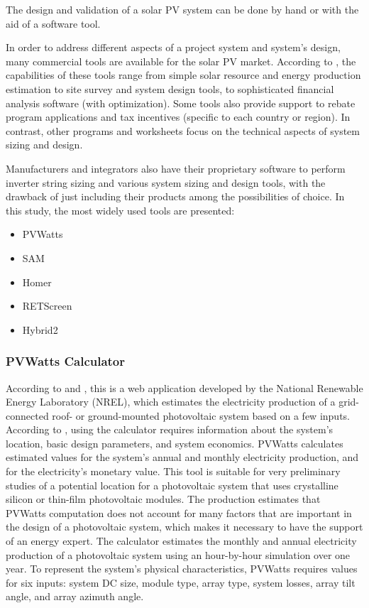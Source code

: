 The design and validation of a solar PV system can be done by hand or with the aid of a software tool. 

In order to address different aspects of a project system and system's design, many commercial tools are available for the solar PV market. According to \cite{Brooks}, the capabilities of these tools range from simple solar resource and energy production estimation to site survey and system design tools, to sophisticated financial analysis software (with optimization). Some tools also provide support to rebate program applications and tax incentives (specific to each country or region). In contrast, other programs and worksheets focus on the technical aspects of system sizing and design.
 
Manufacturers and integrators also have their proprietary software to perform inverter string sizing and various system sizing and design tools, with the drawback of just including their products among the possibilities of choice. In this study, the most widely used tools are presented: 

\begin{itemize}
\item PVWatts 
\item SAM
\item Homer
\item RETScreen
\item Hybrid2
\end{itemize}

\subsubsection{PVWatts Calculator}

According to \cite{Freeman} and \cite{NRELDobos}, this is a web application developed by the National Renewable Energy Laboratory (NREL), which estimates the electricity production of a grid-connected roof- or ground-mounted photovoltaic system based on a few inputs. According to \cite{NRELDobos}, using the calculator requires information about the system's location, basic design parameters, and system economics. PVWatts calculates estimated values for the system's annual and monthly electricity production, and for the electricity's monetary value. This tool is suitable for very preliminary studies of a potential location for a photovoltaic system that uses crystalline silicon or thin-film photovoltaic modules. The production estimates that PVWatts computation does not account for many factors that are important in the design of a photovoltaic system, which makes it necessary to have the support of an energy expert. The calculator estimates the monthly and annual electricity production of a photovoltaic system using an hour-by-hour simulation over one year. To represent the system's physical characteristics, PVWatts requires values for six inputs: system DC size, module type, array type, system losses, array tilt angle, and array azimuth angle.

